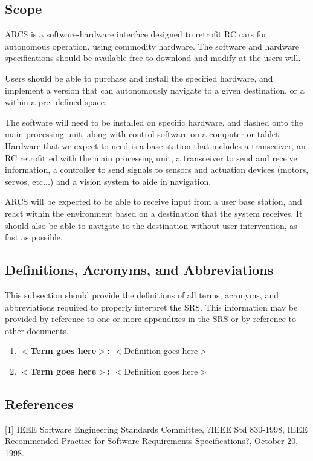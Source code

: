 \documentclass[draftclsnofoot,onecolumn,10pt]{IEEEtran}
\begin{document}
\subsection{Scope} %
ARCS is a software-hardware interface designed to retrofit RC cars for autonomous 
operation, using commodity hardware. The software and hardware specifications 
should be available free to download and modify at the users will. \par
Users should be able to purchase and install the specified hardware, and implement a 
version that can autonomously navigate to a given destination, or a within a pre-
defined space.  \par
The software will need to be installed on specific hardware, and flashed onto the 
main processing unit, along with control software on a computer or tablet. Hardware 
that we expect to need is a base station that includes a transceiver, an RC retrofitted 
with the main processing unit, a transceiver to send and receive information, a 
controller to send signals to sensors and actuation devices (motors, servos, etc...) and
a vision system to aide in navigation. \par
ARCS will be expected to be able to receive input from a user base station, and react
within the environment based on a destination that the system receives. It should also
be able to navigate to the destination without user intervention, as fast as possible. \par

\subsection{Definitions, Acronyms, and Abbreviations}
This subsection should provide the definitions of all terms, acronyms, and
abbreviations required to properly interpret the SRS. This information may be
provided by reference to one or more appendixes in the SRS or by reference to
other documents.
\begin{enumerate}
	\item \textbf{$<$Term goes here$>$:} $<$Definition goes here$>$
	\item \textbf{$<$Term goes here$>$:} $<$Definition goes here$>$
\end{enumerate}


\subsection{References} %
[1] IEEE Software Engineering Standards Committee, ?IEEE Std 830-1998, IEEE 
Recommended Practice for Software Requirements Specifications?, October 20, 1998.
\end{document}
